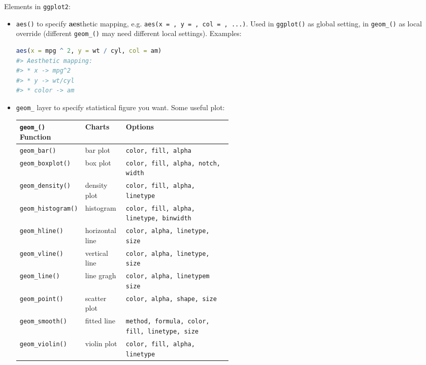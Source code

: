     Elements in \lstinline|ggplot2|:
    \begin{itemize}[topsep=2pt,itemsep=0pt]
        \item \lstinline|aes()| to specify \textbf{aes}thetic mapping, e.g. \lstinline|aes(x = , y = , col = , ...)|. Used in \lstinline|ggplot()| as global setting, in \lstinline|geom_()| as local override (different \lstinline|geom_()| may need different local settings). Examples:
\begin{lstlisting}[language=R]
aes(x = mpg ^ 2, y = wt / cyl, col = am)
#> Aesthetic mapping: 
#> * x -> mpg^2
#> * y -> wt/cyl
#> * color -> am
\end{lstlisting}

        \item \lstinline|geom_| layer to specify statistical figure you want. Some useful plot:
\begin{table}[H]
    \centering
    \renewcommand\arraystretch{1.15}
    \begin{tabularx}{0.9\linewidth}{XXp{0.5\linewidth}}
        \hline
        \hline
        \lstinline|geom_()| Function    &Charts         &Options\\
        \hline
        \lstinline|geom_bar()|          &bar plot       &\lstinline|color, fill, alpha|\\
        \lstinline|geom_boxplot()|      &box plot       &\lstinline|color, fill, alpha, notch, width|\\
        \lstinline|geom_density()|        &density plot   &\lstinline|color, fill, alpha, linetype|\\
        \lstinline|geom_histogram()|    &histogram      &\lstinline|color, fill, alpha, linetype, binwidth|\\
        \lstinline|geom_hline()|        &horizontal line            &\lstinline|color, alpha, linetype, size|\\
        \lstinline|geom_vline()|        &vertical line            &\lstinline|color, alpha, linetype, size|\\
        \lstinline|geom_line()|         &line gragh     &\lstinline|color, alpha, linetypem size|\\
        \lstinline|geom_point()|        &scatter plot       &\lstinline|color, alpha, shape, size|\\
        \lstinline|geom_smooth()|       &fitted line        &\lstinline|method, formula, color, fill, linetype, size|\\
        \lstinline|geom_violin()|       &violin plot        &\lstinline|color, fill, alpha, linetype|\\

\end{tabularx}
\end{table}
\end{itemize}
